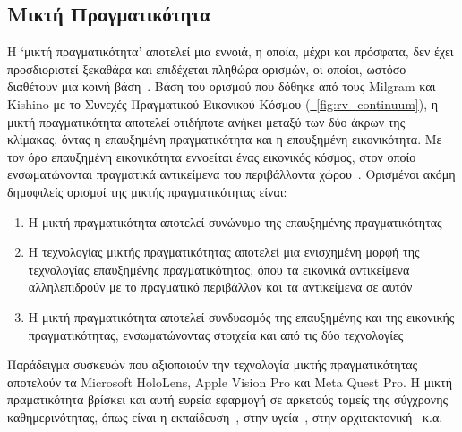 \subsection{Μικτή Πραγματικότητα}\label{subsec:mixedReality}
Η `μικτή πραγματικότητα' αποτελεί μια εννοιά, η οποία, μέχρι και πρόσφατα, δεν έχει προσδιοριστεί ξεκαθάρα και επιδέχεται πληθώρα ορισμών, οι οποίοι, ωστόσο διαθέτουν μια κοινή βάση~\cite{speicher_2019_what}. Βάση του ορισμού που δόθηκε από τους Milgram και Kishino με το Συνεχές Πραγματικού-Εικονικού Κόσμου (\hyperref[fig:rv_continuum]{\schema~\ref*{fig:rv_continuum}}), η μικτή πραγματικότητα αποτελεί οτιδήποτε ανήκει μεταξύ των δύο άκρων της κλίμακας, όντας η επαυξημένη πραγματικότητα και η επαυξημένη εικονικότητα. Με τον όρο επαυξημένη εικονικότητα εννοείται ένας εικονικός κόσμος, στον οποίο ενσωματώνονται πραγματικά αντικείμενα του περιβάλλοντα χώρου~\cite{milgram_1994_augmented}. Ορισμένοι ακόμη δημοφιλείς ορισμοί της μικτής πραγματικότητας είναι:
\begin{enumerate}
    \item Η μικτή πραγματικότητα αποτελεί συνώνυμο της επαυξημένης πραγματικότητας
    \item Η τεχνολογίας μικτής πραγματικότητας αποτελεί μια ενισχημένη μορφή της τεχνολογίας επαυξημένης πραγματικότητας, όπου τα εικονικά αντικείμενα αλληλεπιδρούν με το πραγματικό περιβάλλον και τα αντικείμενα σε αυτόν
    \item Η μικτή πραγματικότητα αποτελεί συνδυασμός της επαυξημένης και της εικονικής πραγματικότητας, ενσωματώνοντας στοιχεία και από τις δύο τεχνολογίες
\end{enumerate}
Παράδειγμα συσκευών που αξιοποιούν την τεχνολογία μικτής πραγματικότητας αποτελούν τα Microsoft HoloLens, Apple Vision Pro και Meta Quest Pro.
Η μικτή πραματικότητα βρίσκει και αυτή ευρεία εφαρμογή σε αρκετούς τομείς της σύγχρονης καθημερινότητας, όπως είναι η εκπαίδευση~\cite{knierim_2018_challenges}\cite{liu_2007_mixed}, στην υγεία~\cite{chen_2017_recent}\cite{tepper_2017_mixed}, στην αρχιτεκτονική~\cite{wang_2008_mixed}\cite{dunston_2005_mixed} κ.α.